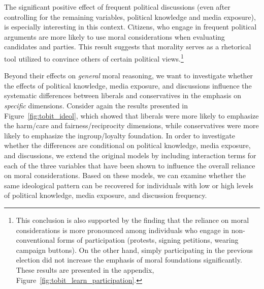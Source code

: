 \documentclass[12pt]{article}
\begin{document}
The significant positive effect of frequent political discussions (even after controlling for the remaining variables, political knowledge and media exposure), is especially interesting in this context. Citizens, who engage in frequent political arguments are more likely to use moral considerations when evaluating candidates and parties. This result suggests that morality serves as a rhetorical tool utilized to convince others of certain political views.\footnote{This conclusion is also supported by the finding that the reliance on moral considerations is more pronounced among individuals who engage in non-conventional forms of participation (protests, signing petitions, wearing campaign buttons). On the other hand, simply participating in the previous election did not increase the emphasis of moral foundations significantly. These results are presented in the appendix, Figure~\ref{fig:tobit_learn_participation}.}

Beyond their effects on \textit{general} moral reasoning, we want to investigate whether the effects of political knowledge, media exposure, and discussions influence the systematic differences between liberals and conservatives in the emphasis on \textit{specific} dimensions. Consider again the results presented in Figure~\ref{fig:tobit_ideol}, which showed that liberals were more likely to emphasize the harm/care and fairness/reciprocity dimensions, while conservatives were more likely to emphasize the ingroup/loyalty foundation. In order to investigate whether the differences are conditional on political knowledge, media exposure, and discussions, we extend the original models by including interaction terms for each of the three variables that have been shown to influence the overall reliance on moral considerations. Based on these models, we can examine whether the same ideological pattern can be recovered for individuals with low or high levels of political knowledge, media exposure, and discussion frequency.
\end{document}
